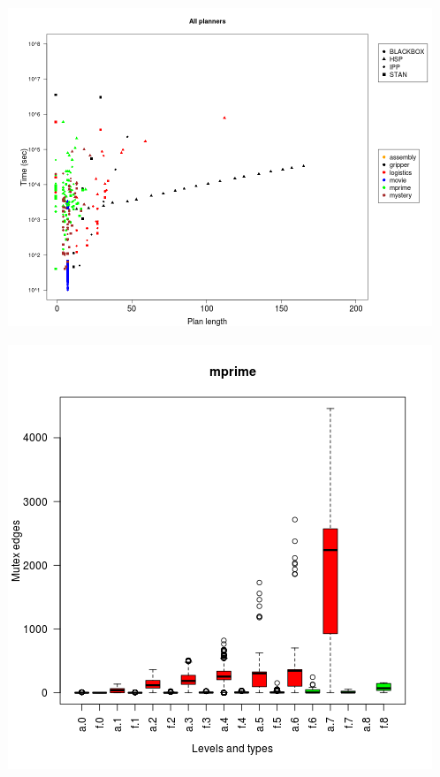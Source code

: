 \documentclass[handout,t]{beamer}
\begin{document}
\begin{frame}
  \begin{figure}[ht!]
    \centering
    \includegraphics[width=0.75\linewidth]{bxplt_All_Time_length}
    \label{fig::figura10} 
  \end{figure}        
\end{frame}


\begin{frame}
  \begin{figure}[ht!]
    \centering
    \includegraphics[width=0.65\linewidth]{dist_exlusive_mprime}
    \label{fig::figura12} 
  \end{figure}        
\end{frame}
\end{document}
